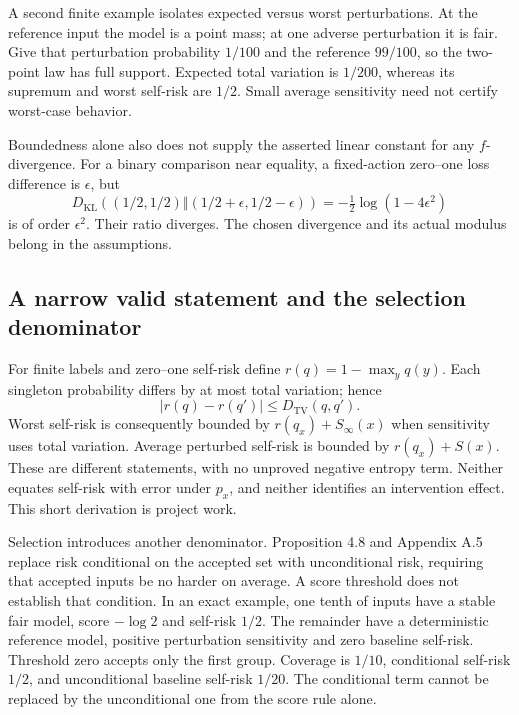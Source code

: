 A second finite example isolates expected versus worst perturbations. At
the reference input the model is a point mass; at one adverse perturbation
it is fair. Give that perturbation probability $1/100$ and the reference
$99/100$, so the two-point law has full support. Expected total variation is
$1/200$, whereas its supremum and worst self-risk are $1/2$. Small average
sensitivity need not certify worst-case behavior.
\citep{exec23_sua_counterexamples}

Boundedness alone also does not supply the asserted linear constant for any
$f$-divergence. For a binary comparison near equality, a fixed-action
zero--one loss difference is $\epsilon$, but
\[
 D_{\mathrm{KL}}((1/2,1/2)\Vert(1/2+\epsilon,1/2-\epsilon))
 =-\tfrac12\log(1-4\epsilon^2)
\]
is of order $\epsilon^2$. Their ratio diverges. The chosen divergence and
its actual modulus belong in the assumptions.
\citep{exec23_sua_counterexamples}

\subsection{A narrow valid statement and the selection denominator}
For finite labels and zero--one self-risk define $r(q)=1-\max_y q(y)$.
Each singleton probability differs by at most total variation; hence
\[
 |r(q)-r(q')|\leq D_{\mathrm{TV}}(q,q').
\]
Worst self-risk is consequently bounded by $r(q_x)+S_\infty(x)$ when
sensitivity uses total variation. Average perturbed self-risk is bounded by
$r(q_x)+S(x)$. These are different statements, with no unproved negative
entropy term. Neither equates self-risk with error under $p_x$, and neither
identifies an intervention effect. This short derivation is project work.
\citep{exec23_sua_counterexamples}

Selection introduces another denominator. Proposition 4.8 and Appendix A.5
replace risk conditional on the accepted set with unconditional risk,
requiring that accepted inputs be no harder on average. A score threshold
does not establish that condition. In an exact example, one tenth of inputs
have a stable fair model, score $-\log2$ and self-risk $1/2$. The remainder
have a deterministic reference model, positive perturbation sensitivity and
zero baseline self-risk. Threshold zero accepts only the first group.
Coverage is $1/10$, conditional self-risk $1/2$, and unconditional baseline
self-risk $1/20$. The conditional term cannot be replaced by the unconditional
one from the score rule alone. \citep{exec23_sua_original,exec23_sua_counterexamples}

